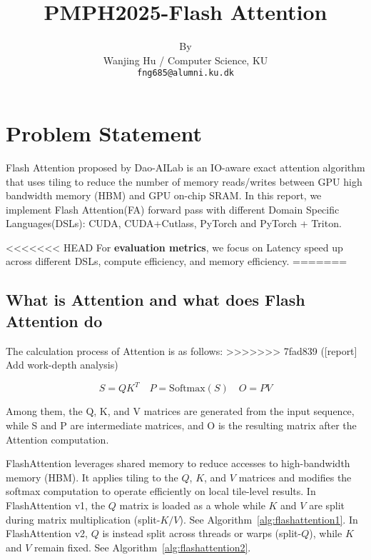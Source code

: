 \documentclass[11pt]{article}
\title{PMPH2025-Flash Attention}
\author{By \\
  Wanjing Hu / Computer Science, KU  \\
  \texttt{fng685@alumni.ku.dk} \\}
\renewcommand\cite{\citep}  %
\begin{document}
\maketitle

\section{Problem Statement}

Flash Attention proposed by Dao-AILab is an IO-aware exact attention algorithm that uses tiling to reduce the number of memory reads/writes between GPU high bandwidth memory (HBM) and GPU on-chip SRAM\cite{dao2022flashattention}. In this report, we implement Flash Attention(FA) forward pass with different Domain Specific Languages(DSLs): CUDA, CUDA+Cutlass, PyTorch and PyTorch + Triton.

<<<<<<< HEAD
For \textbf{evaluation metrics}, we focus on Latency speed up across different DSLs, compute efficiency, and memory efficiency.
=======
\subsection{What is Attention and what does Flash Attention do}
The calculation process of Attention is as follows:
>>>>>>> 7fad839 ([report] Add work-depth analysis)

\[
S = QK^{T} \quad P = \text{Softmax}(S) \quad O = PV
\]

Among them, the Q, K, and V matrices are generated from the input sequence, while S and P are intermediate matrices, and O is the resulting matrix after the Attention computation.

FlashAttention leverages shared memory to reduce accesses to high-bandwidth memory (HBM). It applies tiling to the $Q$, $K$, and $V$ matrices and modifies the softmax computation to operate efficiently on local tile-level results. In FlashAttention v1, the $Q$ matrix is loaded as a whole while $K$ and $V$ are split  during matrix multiplication (split-$K/V$). See Algorithm~\ref{alg:flashattention1}. In FlashAttention v2, $Q$ is instead split across threads or warps (split-$Q$), while $K$ and $V$ remain fixed. See Algorithm~\ref{alg:flashattention2}.
\end{document}
